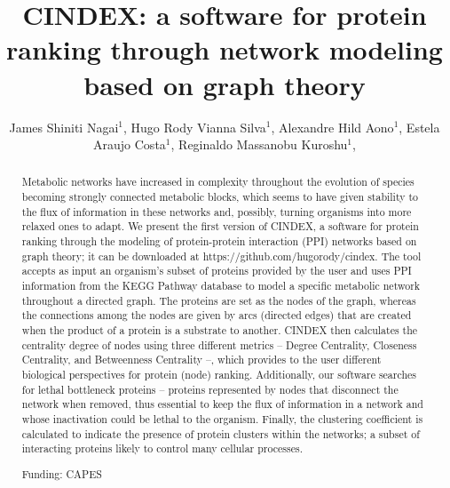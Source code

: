 \documentclass[twoside]{article}
\title{\vspace{-15mm}\fontsize{24pt}{10pt}\selectfont\textbf{ CINDEX: a software for protein ranking through network modeling based on graph theory }} %
\author{ James Shiniti Nagai$^{1}$, Hugo Rody Vianna Silva$^{1}$, Alexandre Hild Aono$^{1}$, Estela Araujo Costa$^{1}$, Reginaldo Massanobu Kuroshu$^{1}$, }
\affil{ 1 Universidade Federal de São Paulo

 }
\date{}
\begin{document}
  
  
  \maketitle %
  
  
  \thispagestyle{fancy} %
  
  
  \begin{abstract}
  Metabolic networks have increased in complexity throughout the evolution of species becoming strongly connected metabolic blocks, which seems to have given stability to the flux of information in these networks and, possibly, turning organisms into more relaxed ones to adapt. We present the first version of CINDEX, a software for protein ranking through the modeling of protein-protein interaction (PPI) networks based on graph theory; it can be downloaded at https://github.com/hugorody/cindex. The tool accepts as input an organism’s subset of proteins provided by the user and uses PPI information from the KEGG Pathway database to model a specific metabolic network throughout a directed graph. The proteins are set as the nodes of the graph, whereas the connections among the nodes are given by arcs (directed edges) that are created when the product of a protein is a substrate to another. CINDEX then calculates the centrality degree of nodes using three different metrics – Degree Centrality, Closeness Centrality, and Betweenness Centrality –, which provides to the user different biological perspectives for protein (node) ranking. Additionally, our software searches for lethal bottleneck proteins – proteins represented by nodes that disconnect the network when removed, thus essential to keep the flux of information in a network and whose inactivation could be lethal to the organism. Finally, the clustering coefficient is calculated to indicate the presence of protein clusters within the networks; a subset of interacting proteins likely to control many cellular processes.
  
  Funding: CAPES \\ 
  \end{abstract}
  
\end{document}
